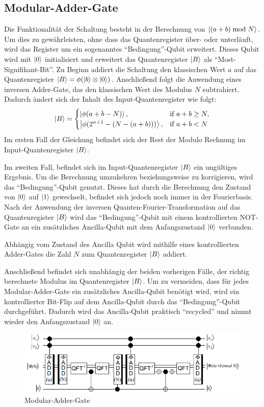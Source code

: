 \documentclass[a4paper,journal]{IEEEtran}
\begin{document}
\subsection{Modular-Adder-Gate}
Die Funktionalität der Schaltung besteht in der Berechnung von
\(\ket{(a+b) \bmod N}\).
Um dies zu gewährleisten, ohne dass das Quantenregister über- oder unterläuft,
wird das Register um ein sogenanntes "`Bedingung"'-Qubit erweitert.
Dieses Qubit wird mit \(\ket{0}\) initialisiert und
erweitert das Quantenregister \(\ket{B}\) als "`Most-Signifikant-Bit"'.
Zu Beginn addiert die Schaltung den klassischen Wert \(a\) auf das Quantenregister
\(\ket{B} = \phi(\ket{b} \otimes \ket{0})\).
Anschließend folgt die Anwendung eines inversen Adder-Gate,
das den klassischen Wert des Modulus \(N\) subtrahiert.
Dadurch ändert sich der Inhalt des Input-Quantenregister wie folgt:
\begin{equation*}
\ket{B} = \begin{cases}
  \ket{\phi(a+b-N)}             ,& \text{if } a+b \geq N,\\
  \ket{\phi(2^{n+1}-(N-(a+b)))} ,& \text{if } a+b < N
\end{cases}
\end{equation*}
Im ersten Fall der Gleichung befindet sich der Rest der Modulo Rechnung im Input-Quantenregister \(\ket{B}\).

Im zweiten Fall, befindet sich im Input-Quantenregister \(\ket{B}\) ein ungültiges Ergebnis.
Um die Berechnung umzukehren beziehungsweise zu korrigieren,
wird das "`Bedingung"'-Qubit genutzt.
Dieses hat durch die Berechnung den Zustand von \(\ket{0}\) auf \(\ket{1}\) gewechselt,
befindet sich jedoch noch immer in der Fourierbasis.
Nach der Anwendung der inversen Quanten-Fourier-Transformation
auf das Quantenregister \(\ket{B}\) wird das "`Bedingung"'-Qubit
mit einem kontrollierten NOT-Gate an ein zusätzliches Ancilla-Qubit mit dem Anfangszustand \(\ket{0}\) verbunden.

Abhängig vom Zustand des Ancilla Qubit wird mithilfe
eines kontrollierten Adder-Gates die Zahl \(N\) zum Quantenregister \(\ket{B}\) addiert.

Anschließend befindet sich unabhängig der beiden vorherigen Fälle,
der richtig berechnete Modulus im Quantenregister \(\ket{B}\).
Um zu vermeiden, dass für jedes Modular-Adder-Gate ein zusätzliches Ancilla-Qubit benötigt wird,
wird ein kontrollierter Bit-Flip auf dem Ancilla-Qubit durch das "`Bedingung"'-Qubit durchgeführt.
Dadurch wird das Ancilla-Qubit praktisch "`recycled"' und nimmt wieder den Anfangszustand \(\ket{0}\) an.
\begin{figure}[!h]
\caption{Modular-Adder-Gate~\cite{beauregard2003circuit}}
\label{fig:modular_adder_gate}
\includegraphics[width=\linewidth]{modular_adder_gate.PNG}
\centering
\end{figure}
\end{document}
